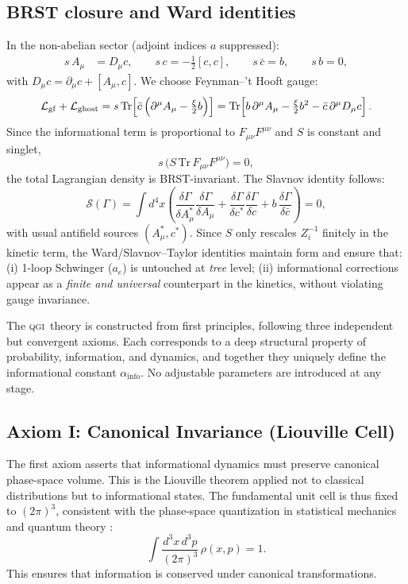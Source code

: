 \documentclass{article}
\numberwithin{equation}{section}
\theoremstyle{plain}
\theoremstyle{definition}
\theoremstyle{remark}
\newcommand{\ainfo}{\alpha_{\text{info}}}
\newcommand{\qgi}{\textsc{qgi}}
\begin{document}
\subsection{BRST closure and Ward identities}
\label{sec:brst}

In the non-abelian sector (adjoint indices $a$ suppressed):
\begin{align}
s\,A_\mu &= D_\mu c, \qquad
s\,c = -\tfrac12 [c,c], \qquad
s\,\bar c = b, \qquad
s\,b=0,
\end{align}
with $D_\mu c=\partial_\mu c+[A_\mu,c]$. We choose Feynman–'t Hooft gauge:
\begin{equation}
\mathcal{L}_{\rm gf}+\mathcal{L}_{\rm ghost}
= s\,\mathrm{Tr}\!\left[\bar c\left(\partial^\mu A_\mu - \tfrac{\xi}{2} b\right)\right]
= \mathrm{Tr}\!\left[b\,\partial^\mu A_\mu - \tfrac{\xi}{2}b^2 - \bar c\,\partial^\mu D_\mu c\right].
\end{equation}
Since the informational term is proportional to $F_{\mu\nu}F^{\mu\nu}$ and $S$ is constant and singlet,
\[
s\,\Big(S\,\mathrm{Tr}\,F_{\mu\nu}F^{\mu\nu}\Big)=0,
\]
the total Lagrangian density is BRST-invariant. The Slavnov identity follows:
\begin{equation}
\mathcal{S}(\Gamma)=\int d^4x\left(\frac{\delta\Gamma}{\delta A^*_\mu}\frac{\delta\Gamma}{\delta A_\mu}
+\frac{\delta\Gamma}{\delta c^*}\frac{\delta\Gamma}{\delta c}
+b\,\frac{\delta\Gamma}{\delta \bar c}\right)=0,
\end{equation}
with usual antifield sources $(A^*_\mu,c^*)$. Since $S$ only rescales $Z_i^{-1}$ finitely in the kinetic term, the Ward/Slavnov–Taylor identities maintain form and ensure that:
(i) 1-loop Schwinger ($a_e$) is untouched at \emph{tree} level; 
(ii) informational corrections appear as a \emph{finite and universal} counterpart in the kinetics, without violating gauge invariance.

The \qgi\ theory is constructed from first principles, following three independent but convergent axioms. Each corresponds to a deep structural property of probability, information, and dynamics, and together they uniquely define the informational constant $\ainfo$. No adjustable parameters are introduced at any stage.

\subsection{Axiom I: Canonical Invariance (Liouville Cell)}
The first axiom asserts that informational dynamics must preserve canonical phase-space volume. This is the Liouville theorem applied not to classical distributions but to informational states. The fundamental unit cell is thus fixed to $(2\pi)^3$, consistent with the phase-space quantization in statistical mechanics and quantum theory \cite{Fisher1925, Jeffreys1946}:
\begin{equation}
\int \frac{d^3x\,d^3p}{(2\pi)^3}\,\rho(x,p) = 1.
\end{equation}
This ensures that information is conserved under canonical transformations.
\end{document}
